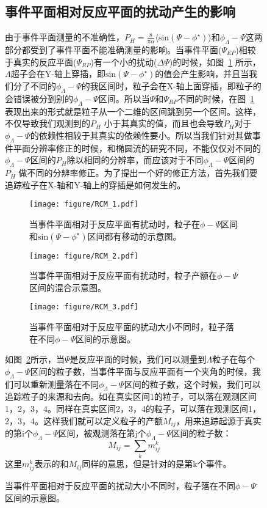 \begin{figure}[htbp]
\subsection{事件平面相对反应平面的扰动产生的影响}
由于事件平面测量的不准确性，$P_{H} = \frac{8}{\pi\alpha} \langle \mathrm{sin}(\Psi-\phi^{\star}) \rangle $和$\phi_{\Lambda}-\Psi$这两部分都受到了事件平面不能准确测量的影响。当事件平面($\Psi_{EP}$)相较于真实的反应平面($\Psi_{RP}$)有一个小的扰动($\Delta\Psi$)的时候，如图~\ref{fig:RCM_1} 所示，$\Lambda$超子会在Y-轴上穿插，即$\mathrm{sin}(\Psi-\phi^{\star})$的值会产生影响，并且当我们分了不同的$\phi_{\Lambda}-\Psi$的我区间时，粒子会在X-轴上面穿插，即粒子的会错误被分到别的$\phi_{\Lambda}-\Psi$区间。所以当$\Psi$和$\Psi_{RP}$不同的时候，在图~\ref{fig:RCM_1} 表现出来的形式就是粒子从一个二维的区间跳到另一个区间。这样，不仅导致我们观测到的$P_{H}$ 小于其真实的值，而且也会导致$P_{H}$对于$\phi_{\Lambda}-\Psi$的依赖性相较于其真实的依赖性要小。所以当我们针对其做事件平面分辨率修正的时候，和椭圆流的研究不同，不能仅仅对不同的$\phi_{\Lambda}-\Psi$区间的$P_{H}$除以相同的分辨率，而应该对于不同$\phi_{\Lambda}-\Psi$区间的$P_{H}$ 做不同的分辨率修正。为了提出一个好的修正方法，首先我们要追踪粒子在X-轴和Y-轴上的穿插是如何发生的。
\begin{figure}[htbp]
\centering
\texttt{[image: figure/RCM\_1.pdf]}
\caption{当事件平面相对于反应平面有扰动时，粒子在$\phi-\Psi$区间和$\mathrm{sin}(\Psi-\phi^{\star})$区间都有移动的示意图。}
\label{fig:RCM_1}
\end{figure}

\begin{figure}[htbp]
\centering
\texttt{[image: figure/RCM\_2.pdf]}
\caption{当事件平面相对于反应平面有扰动时，粒子产额在$\phi-\Psi$区间的混合示意图。}
\label{fig:RCM_2}
\end{figure}

\begin{figure}[htbp]
\centering
\texttt{[image: figure/RCM\_3.pdf]}
\caption{当事件平面相对于反应平面的扰动大小不同时，粒子落在不同$\phi-\Psi$区间的示意图。}
\label{fig:RCM_3}
\end{figure}

如图~\ref{fig:RCM_2}所示，当$\Psi$是反应平面的时候，我们可以测量到$\Lambda$粒子在每个$\phi_{\Lambda}-\Psi$区间的粒子数，当事件平面与反应平面有一个夹角的时候，我们可以重新测量落在不同$\phi_{\Lambda}-\Psi$区间的粒子数，这个时候，我们可以追踪粒子的来源和去向。如在真实区间1的粒子，可以落在观测区间1，2，3，4。同样在真实区间2，3，4的粒子，可以落在观测区间1，2，3，4。这样我们就可以定义粒子的产额$M_{ij}$，用来追踪起源于真实的第i个$\phi_{\Lambda}-\Psi$区间，被观测落在第j个$\phi_{\Lambda}-\Psi$区间的粒子数：
\begin{equation}
\label{eq:M_ij}
M_{ij} = \sum_{k} m^{k}_{ij}
\end{equation}
这里$m^{k}_{ij}$表示的和$M_{ij}$同样的意思，但是针对的是第k个事件。


\end{figure}
